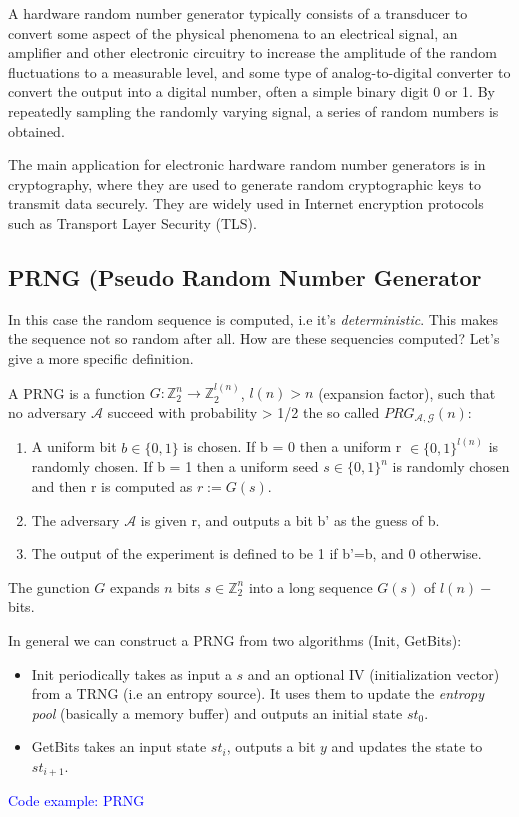\documentclass{article}
\begin{document}
A hardware random number generator typically consists of a transducer to convert some aspect of the physical phenomena to an electrical signal, an amplifier and other electronic circuitry to increase the amplitude of the random fluctuations to a measurable level, and some type of analog-to-digital converter to convert the output into a digital number, often a simple binary digit 0 or 1. By repeatedly sampling the randomly varying signal, a series of random numbers is obtained.

The main application for electronic hardware random number generators is in cryptography, where they are used to generate random cryptographic keys to transmit data securely. They are widely used in Internet encryption protocols such as Transport Layer Security (TLS). 
\subsection{PRNG (Pseudo Random Number Generator}
In this case the random sequence is computed, i.e it's \textit{deterministic}. This makes the sequence not so random after all. How are these sequencies computed?
Let's give a more specific definition.

A PRNG is a function $G: \mathbb{Z}_2^n \to \mathbb{Z}_2^{l(n)}$, $l(n) > n$ (expansion factor), such that no adversary $\mathscr{A}$ succeed with probability > 1/2 the so called  $PRG_{\mathscr{A, G}}(n)$:
\begin{enumerate}[label=\alph*)]
    \item A uniform bit $b \in \{0,1\}$ is chosen. If b = 0 then a uniform r $\in \{0,1\}^{l(n)}$ is randomly chosen. If b = 1 then a uniform seed $s \in \{0,1\}^n$ is randomly chosen and then r is computed as $r := G(s)$.
    \item The adversary $\mathscr{A}$ is given r, and outputs a bit b' as the guess of b.
    \item The output of the experiment is defined to be 1 if b'=b, and 0 otherwise.
\end{enumerate}
The gunction $G$ expands $n$ bits $s \in \mathbb{Z}_2^n$ into a long sequence $G(s)$ of $l(n)-$bits.


In general we can construct a PRNG from two algorithms (Init, GetBits):
\begin{itemize}
    \item Init periodically takes as input a  $s$ and an optional IV (initialization vector) from a TRNG (i.e an entropy source). It uses them to update the \textit{entropy pool} (basically a memory buffer) and outputs an initial state $st_0$.
    \item GetBits takes an input state $st_i$, outputs a bit $y$ and updates the state to $st_{i+1}$.
\end{itemize}
\textcolor{blue}{Code example: PRNG}
\end{document}
